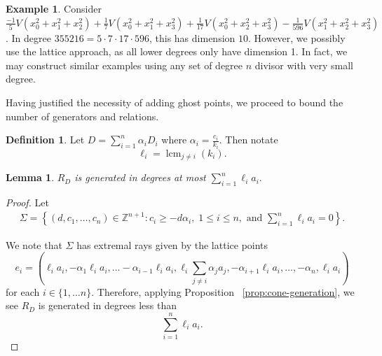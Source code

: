 \documentclass{amsart}
\theoremstyle{plain}
\newtheorem{lem}[thm]{Lemma}
\theoremstyle{definition}
\newtheorem{defn}[thm]{Definition}
\newtheorem{example}[thm]{Example}
\theoremstyle{remark}
\numberwithin{equation}{section}
\newcommand\bz{{\mathbb Z}}
\newcommand\bida{a}
\DeclareMathOperator{\lcm}{lcm}
\begin{document}
\begin{example}
\label{eg:radical}
Consider $\frac{-1}{5}V(x_0^2 + x_1^2 + x_2^2) + \frac{1}{7}V(x_0^2 + x_1^2 +
x_3^2) + \frac{1}{17}V(x_0^2 + x_2^2 + x_3^2) - \frac{1}{596}V(x_1^2 + x_2^2 +
x_3^2)$. In degree $355216 = 5 \cdot 7 \cdot 17 \cdot 596$, this has dimension
$10$. 
However, we possibly use the lattice approach, as all lower degrees only have
dimension 1. In fact, we may construct similar examples using any set of degree
$n$ divisor with very small degree.
\end{example}

Having justified the necessity of adding ghost points, we proceed to bound the
number of generators and relations.

\begin{defn}\label{def:ell_i}
Let $D = \sum_{i=1}^n \alpha_i D_i$ where $\alpha_i = \frac{c_i}{k_i}$.
Then notate
\[\ell_i = \lcm_{j\ne i}(k_i).\]
\end{defn}

\begin{lem} \label{lem:proj-generators}
$R_D$ is generated in degrees at most $\sum_{i=1}^n \ell_i a_i.$

\end{lem}
\begin{proof}
Let 
\begin{align}\label{eqn:Sigma-def}
	\Sigma = \left \{(d, c_1, \ldots, c_n) \in \bz^{n+1} : c_i \geq - d
\alpha_i, \; 1 \leq i \leq n, \text{ and } \sum_{i=1}^{n} \ell_i \bida_i = 0
\right \}.
\end{align}

We note that $\Sigma$ has extremal rays given by the lattice points 
\begin{equation}\label{defn:e-i-proj}
	e_i = \left(\ell_i \bida_i, - \alpha_1 \ell_i \bida_i, \ldots
-\alpha_{i-1} \ell_i \bida_i, \ell_i \sum_{j\ne i} \alpha_j \bida_j,
-\alpha_{i+1} \ell_i \bida_i, \ldots, -\alpha_n, \ell_i \bida_i \right)
\end{equation}
for each $i\in \{1, \ldots n\}$.
Therefore, applying Proposition ~\ref{prop:cone-generation}, we see $R_D$ is generated in degrees less than
\[
	\sum_{i=1}^n \ell_i a_i.
\]
\end{proof}
\end{document}
